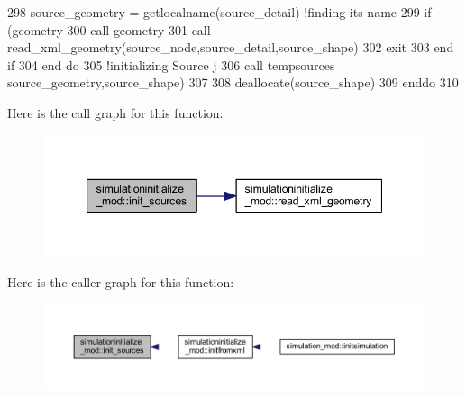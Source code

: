 \begin{DoxyCode}
298             source\_geometry = getlocalname(source\_detail)  \textcolor{comment}{!finding its name}
299             \textcolor{keywordflow}{if} (geometry%
300                 \textcolor{keyword}{call }geometry%
301                 \textcolor{keyword}{call }read\_xml\_geometry(source\_node,source\_detail,source\_shape)
302                 \textcolor{keywordflow}{exit}
303 \textcolor{keywordflow}{            end if}
304 \textcolor{keywordflow}{        end do}
305         \textcolor{comment}{!initializing Source j}
306         \textcolor{keyword}{call }tempsources%
      source\_geometry,source\_shape)
307 
308         \textcolor{keyword}{deallocate}(source\_shape)
309 \textcolor{keywordflow}{    enddo}
310 
\end{DoxyCode}
Here is the call graph for this function\+:\nopagebreak
\begin{figure}[H]
\begin{center}
\leavevmode
\includegraphics[width=347pt]{namespacesimulationinitialize__mod_acaa6b217159e3a10e7db04dd7b0e4058_cgraph}
\end{center}
\end{figure}
Here is the caller graph for this function\+:\nopagebreak
\begin{figure}[H]
\begin{center}
\leavevmode
\includegraphics[width=350pt]{namespacesimulationinitialize__mod_acaa6b217159e3a10e7db04dd7b0e4058_icgraph}
\end{center}
\end{figure}
\mbox{\label{namespacesimulationinitialize__mod_ada0310fe0d45fa2eec30deaf3ad25ba7}} 
